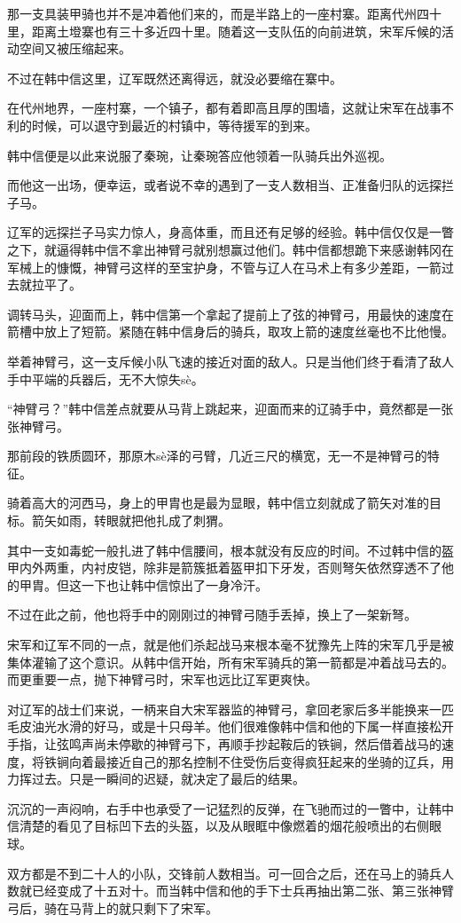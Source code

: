 那一支具装甲骑也并不是冲着他们来的，而是半路上的一座村寨。距离代州四十里，距离土墱寨也有三十多近四十里。随着这一支队伍的向前进筑，宋军斥候的活动空间又被压缩起来。

不过在韩中信这里，辽军既然还离得远，就没必要缩在寨中。

在代州地界，一座村寨，一个镇子，都有着即高且厚的围墙，这就让宋军在战事不利的时候，可以退守到最近的村镇中，等待援军的到来。

韩中信便是以此来说服了秦琬，让秦琬答应他领着一队骑兵出外巡视。

而他这一出场，便幸运，或者说不幸的遇到了一支人数相当、正准备归队的远探拦子马。

辽军的远探拦子马实力惊人，身高体重，而且还有足够的经验。韩中信仅仅是一瞥之下，就逼得韩中信不拿出神臂弓就别想赢过他们。韩中信都想跪下来感谢韩冈在军械上的慷慨，神臂弓这样的至宝护身，不管与辽人在马术上有多少差距，一箭过去就拉平了。

调转马头，迎面而上，韩中信第一个拿起了提前上了弦的神臂弓，用最快的速度在箭槽中放上了短箭。紧随在韩中信身后的骑兵，取攻上箭的速度丝毫也不比他慢。

举着神臂弓，这一支斥候小队飞速的接近对面的敌人。只是当他们终于看清了敌人手中平端的兵器后，无不大惊失sè。

“神臂弓？”韩中信差点就要从马背上跳起来，迎面而来的辽骑手中，竟然都是一张张神臂弓。

那前段的铁质圆环，那原木sè泽的弓臂，几近三尺的横宽，无一不是神臂弓的特征。

骑着高大的河西马，身上的甲胄也是最为显眼，韩中信立刻就成了箭矢对准的目标。箭矢如雨，转眼就把他扎成了刺猬。

其中一支如毒蛇一般扎进了韩中信腰间，根本就没有反应的时间。不过韩中信的盔甲内外两重，内衬皮铠，除非是箭簇抵着盔甲扣下牙发，否则弩矢依然穿透不了他的甲胄。但这一下也让韩中信惊出了一身冷汗。

不过在此之前，他也将手中的刚刚过的神臂弓随手丢掉，换上了一架新弩。

宋军和辽军不同的一点，就是他们杀起战马来根本毫不犹豫先上阵的宋军几乎是被集体灌输了这个意识。从韩中信开始，所有宋军骑兵的第一箭都是冲着战马去的。而更重要一点，抛下神臂弓时，宋军也远比辽军更爽快。

对辽军的战士们来说，一柄来自大宋军器监的神臂弓，拿回老家后多半能换来一匹毛皮油光水滑的好马，或是十只母羊。他们很难像韩中信和他的下属一样直接松开手指，让弦鸣声尚未停歇的神臂弓下，再顺手抄起鞍后的铁锏，然后借着战马的速度，将铁锏向着最接近自己的那名控制不住受伤后变得疯狂起来的坐骑的辽兵，用力挥过去。只是一瞬间的迟疑，就决定了最后的结果。

沉沉的一声闷响，右手中也承受了一记猛烈的反弹，在飞驰而过的一瞥中，让韩中信清楚的看见了目标凹下去的头盔，以及从眼眶中像燃着的烟花般喷出的右侧眼球。

双方都是不到二十人的小队，交锋前人数相当。可一回合之后，还在马上的骑兵人数就已经变成了十五对十。而当韩中信和他的手下士兵再抽出第二张、第三张神臂弓后，骑在马背上的就只剩下了宋军。
